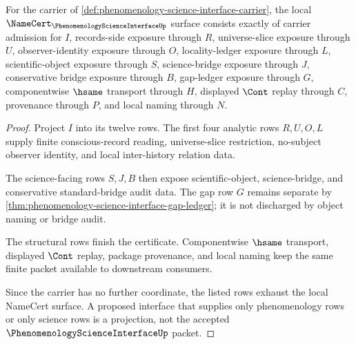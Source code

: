\begin{theorem}
\label{thm:phenomenology-science-interface-namecert-obligations}
For the carrier of \autoref{def:phenomenology-science-interface-carrier}, the local $\NameCert_{\PhenomenologyScienceInterfaceUp}$ surface consists exactly of carrier admission for $I$, records-side exposure through $R$, universe-slice exposure through $U$, observer-identity exposure through $O$, locality-ledger exposure through $L$, scientific-object exposure through $S$, science-bridge exposure through $J$, conservative bridge exposure through $B$, gap-ledger exposure through $G$, componentwise $\hsame$ transport through $H$, displayed $\Cont$ replay through $C$, provenance through $P$, and local naming through $N$.
\end{theorem}
\begin{proof}
Project $I$ into its twelve rows. The first four analytic rows $R,U,O,L$ supply finite conscious-record reading, universe-slice restriction, no-subject observer identity, and local inter-history relation data.

The science-facing rows $S,J,B$ then expose scientific-object, science-bridge, and conservative standard-bridge audit data. The gap row $G$ remains separate by \autoref{thm:phenomenology-science-interface-gap-ledger}; it is not discharged by object naming or bridge audit.

The structural rows finish the certificate. Componentwise $\hsame$ transport, displayed $\Cont$ replay, package provenance, and local naming keep the same finite packet available to downstream consumers.

Since the carrier has no further coordinate, the listed rows exhaust the local NameCert surface. A proposed interface that supplies only phenomenology rows or only science rows is a projection, not the accepted $\PhenomenologyScienceInterfaceUp$ packet.
\end{proof}

